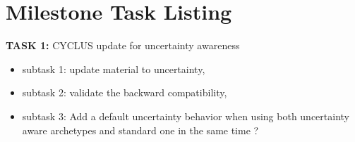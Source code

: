\documentclass[dvips,12pt]{article}
\begin{document}

\pagebreak
\section{Milestone Task Listing}

\noindent\textbf{TASK 1:} CYCLUS update for uncertainty awareness
\begin{itemize}
\item subtask 1: update material to uncertainty,
\item subtask 2: validate the backward compatibility, 
\item subtask 3: Add a default uncertainty behavior when using both uncertainty aware archetypes and standard one in the same time ?
\end{itemize}
\end{document}
